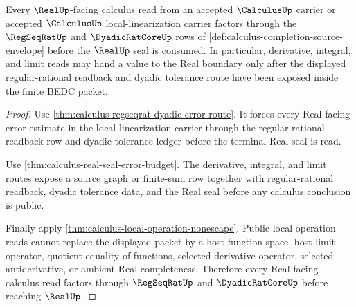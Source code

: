 \begin{theorem}
\label{thm:calculus-completion-source-real-readback}
Every $\RealUp$-facing calculus read from an accepted $\CalculusUp$ carrier or accepted $\CalculusUp$ local-linearization carrier factors through the $\RegSeqRatUp$ and $\DyadicRatCoreUp$ rows of \autoref{def:calculus-completion-source-envelope} before the $\RealUp$ seal is consumed. In particular, derivative, integral, and limit reads may hand a value to the Real boundary only after the displayed regular-rational readback and dyadic tolerance route have been exposed inside the finite BEDC packet.
\end{theorem}
\begin{proof}
Use \autoref{thm:calculus-regseqrat-dyadic-error-route}. It forces every Real-facing error estimate in the local-linearization carrier through the regular-rational readback row and dyadic tolerance ledger before the terminal Real seal is read.

Use \autoref{thm:calculus-real-seal-error-budget}. The derivative, integral, and limit routes expose a source graph or finite-sum row together with regular-rational readback, dyadic tolerance data, and the Real seal before any calculus conclusion is public.

Finally apply \autoref{thm:calculus-local-operation-nonescape}. Public local operation reads cannot replace the displayed packet by a host function space, host limit operator, quotient equality of functions, selected derivative operator, selected antiderivative, or ambient Real completeness. Therefore every Real-facing calculus read factors through $\RegSeqRatUp$ and $\DyadicRatCoreUp$ before reaching $\RealUp$.
\end{proof}

